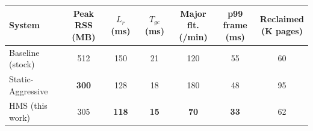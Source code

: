 \begin{tabular}{lcccccc}
\toprule
System & \makecell{Peak RSS\\(MB)} & \makecell{$L_r$\\(ms)} & \makecell{$T_{gc}$\\(ms)} & \makecell{Major flt.\\(/min)} & \makecell{p99 frame\\(ms)} & \makecell{Reclaimed\\(K pages)} \\
\midrule
Baseline (stock) & 512 & 150 & 21 & 120 & 55 & 60 \\
Static-Aggressive & \textbf{300} & 128 & 18 & 180 & 48 & 95 \\
HMS (this work) & 305 & \textbf{118} & \textbf{15} & \textbf{70} & \textbf{33} & 62 \\
\bottomrule
\end{tabular}
